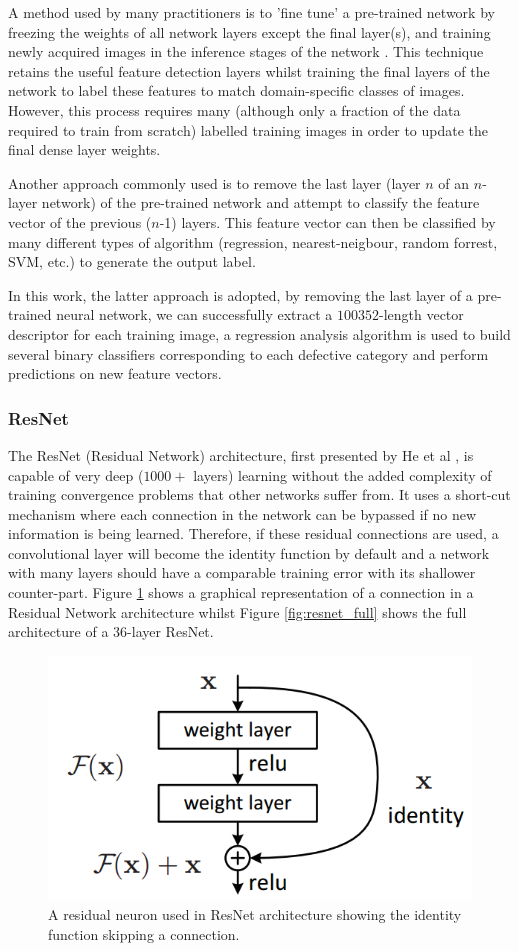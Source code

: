 \documentclass[fleqn,twoside]{article}
\begin{document}
A method used by many practitioners is to 'fine tune' a pre-trained network by freezing the weights of all network layers except the final layer(s), and training newly acquired images in the inference stages of the network \cite{girshick}. This technique retains the useful feature detection layers whilst training the final layers of the network to label these features to match domain-specific classes of images. However, this process requires many (although only a fraction of the data required to train from scratch) labelled training images in order to update the final dense layer weights. 

Another approach commonly used is to remove the last layer (layer $n$ of an $n$-layer network) of the pre-trained network and attempt to classify the feature vector of the previous ($n$-1) layers. This feature vector can then be classified by many different types of algorithm (regression, nearest-neigbour, random forrest, SVM, etc.) to generate the output label.

In this work, the latter approach is adopted, by removing the last layer of a pre-trained neural network, we can successfully extract a $100352$-length vector descriptor for each training image, a regression analysis algorithm is used to build several binary classifiers corresponding to each defective category and perform predictions on new feature vectors.

\subsubsection{ResNet}
\label{sec:resnet}

The ResNet (Residual Network) architecture, first presented by He et al \cite{he}, is capable of very deep ($1000+$ layers) learning without the added complexity of training convergence problems that other networks suffer from. It uses a short-cut mechanism where each connection in the network can be bypassed if no new information is being learned. Therefore, if these residual connections are used, a convolutional layer will become the identity function by default and a network with many layers should have a comparable training error with its shallower counter-part. Figure \ref{fig:residual} shows a graphical representation of a connection in a Residual Network architecture whilst Figure \ref{fig:resnet_full} shows the full architecture of a $36$-layer ResNet.


\begin{figure}[h]
	\centering
	\includegraphics[width=0.7\linewidth]{residual_neuron.png}
	\caption{A residual neuron used in ResNet architecture showing the identity function skipping a connection.}
	\label{fig:residual}
\end{figure}
\end{document}
